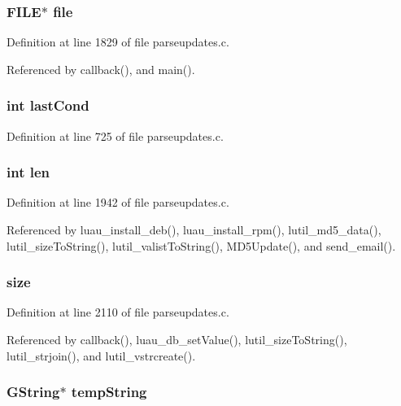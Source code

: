 \subsubsection{\setlength{\rightskip}{0pt plus 5cm}FILE$\ast$ {\bf file}}\label{parseupdates_8c_a94}




Definition at line 1829 of file parseupdates.c.

Referenced by callback(), and main().
\subsubsection{\setlength{\rightskip}{0pt plus 5cm}int {\bf last\-Cond}}\label{parseupdates_8c_a91}




Definition at line 725 of file parseupdates.c.
\subsubsection{\setlength{\rightskip}{0pt plus 5cm}int {\bf len}}\label{parseupdates_8c_a95}




Definition at line 1942 of file parseupdates.c.

Referenced by luau\_\-install\_\-deb(), luau\_\-install\_\-rpm(), lutil\_\-md5\_\-data(), lutil\_\-size\-To\-String(), lutil\_\-valist\-To\-String(), MD5Update(), and send\_\-email().
\subsubsection{ {\bf size}}\label{parseupdates_8c_a93}




Definition at line 2110 of file parseupdates.c.

Referenced by callback(), luau\_\-db\_\-set\-Value(), lutil\_\-size\-To\-String(), lutil\_\-strjoin(), and lutil\_\-vstrcreate().
\subsubsection{\setlength{\rightskip}{0pt plus 5cm}GString$\ast$ {\bf temp\-String}}\label{parseupdates_8c_a89}




